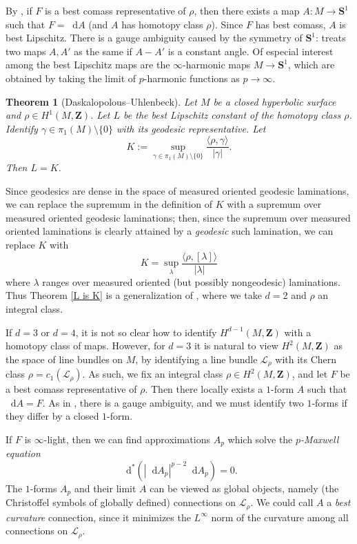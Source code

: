 \documentclass[reqno,11pt]{amsart}
\newcommand{\ZZ}{\mathbf{Z}}
\newcommand{\Sph}{\mathbf S}
\newcommand*\dif{\mathop{}\!\mathrm{d}}
\newcommand{\dfn}[1]{\emph{#1}\index{#1}}
\newtheorem{theorem}{Theorem}[section]
\theoremstyle{definition}
\numberwithin{equation}{section}
\begin{document}
By \cite[\S2.1]{daskalopoulos2020transverse}, if $F$ is a best comass representative of $\rho$, then there exists a map $A: M \to \Sph^1$ such that $F = \dif A$ (and $A$ has homotopy class $\rho$).
Since $F$ has best comass, $A$ is best Lipschitz.
There is a gauge ambiguity caused by the symmetry of $\Sph^1$: \cite{daskalopoulos2020transverse} treats two maps $A, A'$ as the same if $A - A'$ is a constant angle.
Of especial interest among the best Lipschitz maps are the $\infty$-harmonic maps $M \to \Sph^1$, which are obtained by taking the limit of $p$-harmonic functions as $p \to \infty$.

\begin{theorem}[Daskalopolous--Uhlenbeck]
Let $M$ be a closed hyperbolic surface and $\rho \in H^1(M, \ZZ)$.
Let $L$ be the best Lipschitz constant of the homotopy class $\rho$.
Identify $\gamma \in \pi_1(M) \setminus \{0\}$ with its geodesic representative.
Let
$$K := \sup_{\gamma \in \pi_1(M) \setminus \{0\}} \frac{\langle \rho, \gamma\rangle}{|\gamma|}.$$
Then $L = K$.
\end{theorem}

Since geodesics are dense in the space of measured oriented geodesic laminations, we can replace the supremum in the definition of $K$ with a supremum over measured oriented geodesic laminations; then, since the supremum over measured oriented laminations is clearly attained by a \emph{geodesic} such lamination, we can replace $K$ with 
$$K = \sup_\lambda \frac{\langle \rho, [\lambda]\rangle}{|\lambda|}$$
where $\lambda$ ranges over measured oriented (but possibly nongeodesic) laminations.
Thus Theorem \ref{L is K} is a generalization of \cite[Theorem 5.8]{daskalopoulos2020transverse}, where we take $d = 2$ and $\rho$ an integral class.

If $d = 3$ or $d = 4$, it is not so clear how to identify $H^{d - 1}(M, \ZZ)$ with a homotopy class of maps.
However, for $d = 3$ it is natural to view $H^2(M, \ZZ)$ as the space of line bundles on $M$, by identifying a line bundle $\mathscr L_\rho$ with its Chern class $\rho = c_1(\mathscr L_\rho)$.
As such, we fix an integral class $\rho \in H^2(M, \ZZ)$, and let $F$ be a best comass representative of $\rho$.
Then there locally exists a $1$-form $A$ such that $\dif A = F$.
As in \cite{daskalopoulos2020transverse}, there is a gauge ambiguity, and we must identify two $1$-forms if they differ by a closed $1$-form.

If $F$ is $\infty$-light, then we can find approximations $A_p$ which solve the \dfn{$p$-Maxwell equation}
$$\dif^* (|\dif A_p|^{p - 2} \dif A_p) = 0.$$
The $1$-forms $A_p$ and their limit $A$ can be viewed as global objects, namely (the Christoffel symbols of globally defined) connections on $\mathscr L_\rho$.
We could call $A$ a \dfn{best curvature} connection, since it minimizes the $L^\infty$ norm of the curvature among all connections on $\mathscr L_\rho$.
\end{document}
